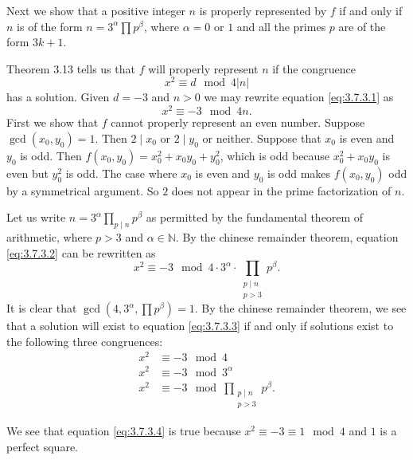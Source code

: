 \documentclass[12 pt]{amsart}
\begin{document}
  Next we show that
  a positive integer $n$ is properly represented by $f$
  if and only if $n$ is of the form 
  $n = 3^{\alpha} \prod p^{\beta}$,
  where $\alpha = 0$ or $1$ and all the primes $p$ are of the form
  $3k + 1$. 

  Theorem 3.13 tells us that $f$ will properly represent $n$
  if the congruence
  \begin{equation}
    \label{eq:3.7.3.1}
    x^2 \equiv d \mod 4 |n|
  \end{equation}
  has a solution.
  Given $d = -3$ and $n > 0$ we may rewrite equation \ref{eq:3.7.3.1}
  as 
  \begin{equation}
    \label{eq:3.7.3.2}
    x^2 \equiv -3 \mod 4 n.
  \end{equation}
  First we show that $f$ cannot properly represent an even number.
  Suppose $\gcd(x_0, y_0) = 1$.
  Then $2 \mid x_0$ or $2 \mid y_0$ or neither.
  Suppose that $x_0$ is even and $y_0$ is odd.
  Then $f(x_0, y_0) = x_0^2 + x_0 y_0 + y_0^2$, which is 
  odd because $x_0^2 + x_0 y_0$ is even but $y_0^2$ is odd.
  The case where $x_0$ is even and $y_0$ is odd makes
  $f(x_0, y_0)$ odd by a symmetrical argument.
  So $2$ does not appear in the prime factorization of $n$.
  
  Let us write $n = 3^{\alpha}\prod_{p \mid n} p^{\beta}$
  as permitted by the fundamental theorem of arithmetic, where $p > 3$
  and $\alpha \in \mathbb{N}$.
  By the chinese remainder theorem, 
  equation \ref{eq:3.7.3.2} can be rewritten as 
  \begin{equation}
    \label{eq:3.7.3.3}
    x^2 \equiv -3 \mod 4 \cdot 3^\alpha 
        \cdot \prod_{\substack{p \mid n\\p > 3}} p^{\beta}.
      \end{equation}
  It is clear that $\gcd \left( 4, 3^{\alpha}, \prod p^{\beta} \right) = 1$.
  By the chinese remainder theorem, we see that a solution will exist to 
  equation \ref{eq:3.7.3.3} if and only if solutions exist to the following
  three congruences:
  \begin{align}
    \label{eq:3.7.3.4}
    x^2 &\equiv -3 \mod 4 \\
    \label{eq:3.7.3.5}
    x^2 &\equiv -3 \mod 3^\alpha  \\
    \label{eq:3.7.3.6}
    x^2 &\equiv -3 \mod \prod_{\substack{p \mid n\\p > 3}} p^{\beta}.
  \end{align}
  
  We see that equation \ref{eq:3.7.3.4} is true because
  $x^2 \equiv -3 \equiv 1 \mod 4$ and $1$ is a perfect square.
\end{document}
